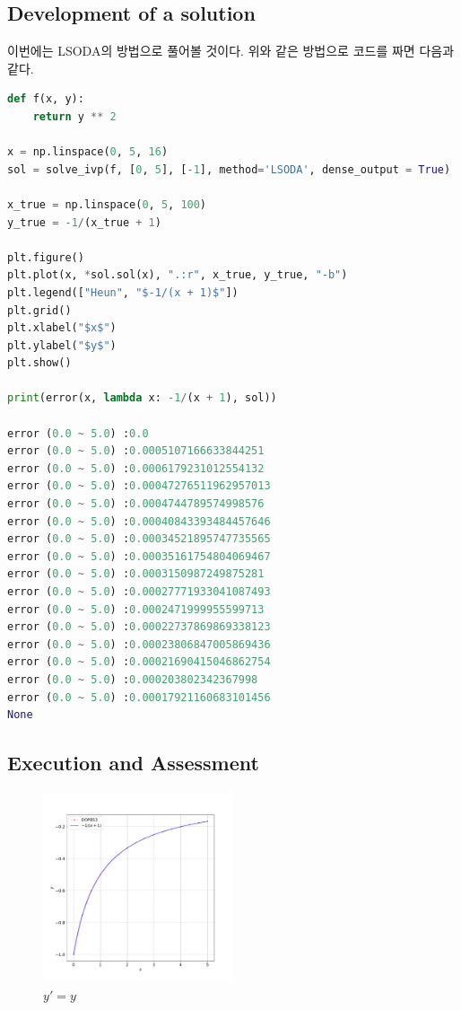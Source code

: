 \documentclass[11pt]{article}
\begin{document}
\subsection{Development of a solution} 
이번에는 LSODA의 방법으로 풀어볼 것이다. 위와 같은 방법으로 코드를 짜면 다음과 같다.

\begin{lstlisting}[language=Python]
def f(x, y):
    return y ** 2

x = np.linspace(0, 5, 16)
sol = solve_ivp(f, [0, 5], [-1], method='LSODA', dense_output = True)

x_true = np.linspace(0, 5, 100)
y_true = -1/(x_true + 1)

plt.figure()
plt.plot(x, *sol.sol(x), ".:r", x_true, y_true, "-b")
plt.legend(["Heun", "$-1/(x + 1)$"])
plt.grid()
plt.xlabel("$x$")
plt.ylabel("$y$")
plt.show()

print(error(x, lambda x: -1/(x + 1), sol))

error (0.0 ~ 5.0) :0.0
error (0.0 ~ 5.0) :0.0005107166633844251
error (0.0 ~ 5.0) :0.0006179231012554132
error (0.0 ~ 5.0) :0.00047276511962957013
error (0.0 ~ 5.0) :0.0004744789574998576
error (0.0 ~ 5.0) :0.00040843393484457646
error (0.0 ~ 5.0) :0.00034521895747735565
error (0.0 ~ 5.0) :0.00035161754804069467
error (0.0 ~ 5.0) :0.0003150987249875281
error (0.0 ~ 5.0) :0.00027771933041087493
error (0.0 ~ 5.0) :0.0002471999955599713
error (0.0 ~ 5.0) :0.00022737869869338123
error (0.0 ~ 5.0) :0.00023806847005869436
error (0.0 ~ 5.0) :0.00021690415046862754
error (0.0 ~ 5.0) :0.000203802342367998
error (0.0 ~ 5.0) :0.00017921160683101456
None
\end{lstlisting}

\subsection{Execution and Assessment}

\begin{figure}[!ht]
  \centering
  \includegraphics[width=0.5\textwidth]{DOP853.pdf}
  \caption{$y' = y$ }
\end{figure}
\end{document}
